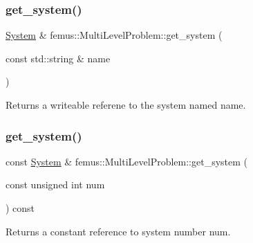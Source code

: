 \subsubsection{\texorpdfstring{get\+\_\+system()}{get\_system()}\hspace{0.1cm}{\footnotesize\ttfamily [6/8]}}
{\footnotesize\ttfamily \mbox{\hyperlink{classfemus_1_1_system}{System}} \& femus\+::\+Multi\+Level\+Problem\+::get\+\_\+system (\begin{DoxyParamCaption}\item[{const std\+::string \&}]{name }\end{DoxyParamCaption})\hspace{0.3cm}{\ttfamily [inline]}}

\begin{DoxyReturn}{Returns}
a writeable referene to the system named {\ttfamily name}. 
\end{DoxyReturn}
\mbox{\label{classfemus_1_1_multi_level_problem_a8c9768235a89327d0326e275094fb46a}} 
\subsubsection{\texorpdfstring{get\+\_\+system()}{get\_system()}\hspace{0.1cm}{\footnotesize\ttfamily [7/8]}}
{\footnotesize\ttfamily const \mbox{\hyperlink{classfemus_1_1_system}{System}} \& femus\+::\+Multi\+Level\+Problem\+::get\+\_\+system (\begin{DoxyParamCaption}\item[{const unsigned int}]{num }\end{DoxyParamCaption}) const\hspace{0.3cm}{\ttfamily [inline]}}

\begin{DoxyReturn}{Returns}
a constant reference to system number {\ttfamily num}. 
\end{DoxyReturn}
\mbox{\label{classfemus_1_1_multi_level_problem_a4012d3dbe706700f438dd5b57cb42d41}} 
